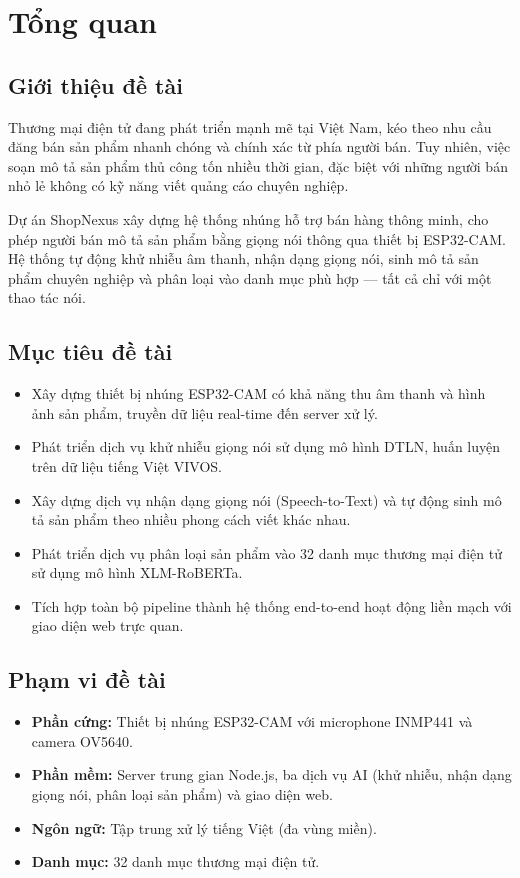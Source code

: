 \chapter{Tổng quan}

\section{Giới thiệu đề tài}

Thương mại điện tử đang phát triển mạnh mẽ tại Việt Nam, kéo theo nhu cầu
đăng bán sản phẩm nhanh chóng và chính xác từ phía người bán. Tuy nhiên,
việc soạn mô tả sản phẩm thủ công tốn nhiều thời gian, đặc biệt với những
người bán nhỏ lẻ không có kỹ năng viết quảng cáo chuyên nghiệp.

Dự án ShopNexus xây dựng hệ thống nhúng hỗ trợ bán hàng thông minh, cho phép
người bán mô tả sản phẩm bằng giọng nói thông qua thiết bị ESP32-CAM. Hệ thống
tự động khử nhiễu âm thanh, nhận dạng giọng nói, sinh mô tả sản phẩm chuyên
nghiệp và phân loại vào danh mục phù hợp --- tất cả chỉ với một thao tác nói.

\section{Mục tiêu đề tài}

\begin{itemize}
\item Xây dựng thiết bị nhúng ESP32-CAM có khả năng thu âm thanh và hình ảnh
  sản phẩm, truyền dữ liệu real-time đến server xử lý.
\item Phát triển dịch vụ khử nhiễu giọng nói sử dụng mô hình DTLN,
  huấn luyện trên dữ liệu tiếng Việt VIVOS.
\item Xây dựng dịch vụ nhận dạng giọng nói (Speech-to-Text) và tự động
  sinh mô tả sản phẩm theo nhiều phong cách viết khác nhau.
\item Phát triển dịch vụ phân loại sản phẩm vào 32 danh mục thương mại
  điện tử sử dụng mô hình XLM-RoBERTa.
\item Tích hợp toàn bộ pipeline thành hệ thống end-to-end hoạt động liền mạch
  với giao diện web trực quan.
\end{itemize}

\section{Phạm vi đề tài}

\begin{itemize}
\item \textbf{Phần cứng:} Thiết bị nhúng ESP32-CAM với microphone INMP441
  và camera OV5640.
\item \textbf{Phần mềm:} Server trung gian Node.js, ba dịch vụ AI
  (khử nhiễu, nhận dạng giọng nói, phân loại sản phẩm) và giao diện web.
\item \textbf{Ngôn ngữ:} Tập trung xử lý tiếng Việt (đa vùng miền).
\item \textbf{Danh mục:} 32 danh mục thương mại điện tử.
\end{itemize}

